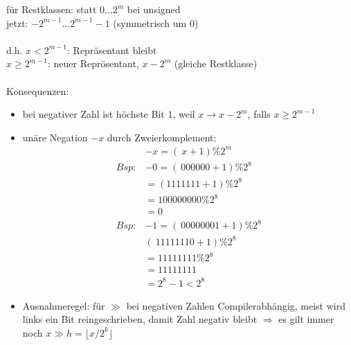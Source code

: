 \documentclass{article}
\begin{document}
	für Restklassen: statt $0 \dots 2^m $ bei unsigned \\
	jetzt: $-2^{m-1} \dots 2^{m-1}-1 $ (symmetrisch um 0) \\ \\
	d.h. $x<2^{m-1} $: Repräsentant bleibt \\
	$x \geq 2^{m-1} $: neuer Reprösentant, $x-2^m $ (gleiche Restklasse) \\ \\ Konsequenzen:

	\begin{itemize}
		\item bei negativer Zahl ist höchste Bit $1$, weil $x \rightarrow x-2^m $, falls $x \geq 2^{m-1} $
		\item unäre Negation $-x$ durch Zweierkomplement:
		\begin{align*}
			& -x = (~x+1)\%2^m \\
			Bsp: & -0 = (~000000+1) \% 2^8 \\
			&    = (1111111+1) \% 2^8 \\
			&     = 100000000 \% 2^8 \\
			& = 0 \\
			Bsp: & -1 = (~00000001 + 1) \% 2^8 \\ 
			& (~ 11111110 + 1) \% 2^8 \\
			& = 11111111 \% 2^8 \\
			& = 11111111 \\
			& = 2^8-1 < 2^8 
		\end{align*}

		\item Ausnahmeregel: für $\gg$ bei negativen Zahlen Compilerabhängig, meist wird links ein Bit reingeschrieben, damit Zahl negativ bleibt $\Rightarrow$ es gilt immer noch $x \gg h = \lfloor x/2^k\rfloor$
	\end{itemize}
\end{document}
